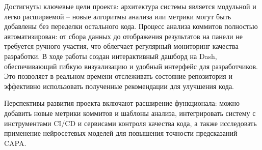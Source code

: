 Достигнуты ключевые цели проекта: архитектура системы является модульной и легко расширяемой – новые алгоритмы анализа или метрики могут быть добавлены без переделки остального кода. Процесс анализа коммитов полностью автоматизирован: от сбора данных до отображения результатов на панели не требуется ручного участия, что облегчает регулярный мониторинг качества разработки.  В ходе работы создан интерактивный дашборд на Dash, обеспечивающий гибкую визуализацию и удобный интерфейс для разработчиков. Это позволяет в реальном времени отслеживать состояние репозитория и эффективно использовать полученные рекомендации для улучшения кода.

Перспективы развития проекта включают расширение функционала: можно добавить новые метрики коммитов и шаблоны анализа, интегрировать систему с инструментами CI/CD и сервисами контроля качества кода, а также исследовать применение нейросетевых моделей для повышения точности предсказаний CAPA.